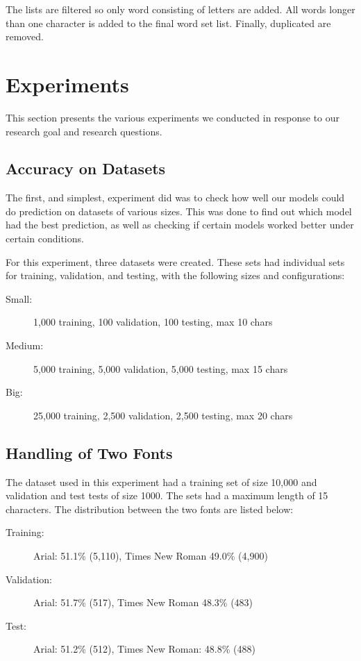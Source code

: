 The lists are filtered so only word consisting of letters are added. All words longer than one character is added to the final word set list. Finally, duplicated are removed.


\section{Experiments}
\label{sec:experiments_details}
This section presents the various experiments we conducted in response to our research goal and research questions.

\subsection{Accuracy on Datasets}
\label{sec:accuracy_on_datasets}
The first, and simplest, experiment did was to check how well our models could do prediction on datasets of various sizes. This was done to find out which model had the best prediction, as well as checking if certain models worked better under certain conditions.

For this experiment, three datasets were created. These sets had individual sets for training, validation, and testing, with the following sizes and configurations:

\vspace{0.5cm}
\begin{minipage}{0.8\linewidth}
    \begin{description}
        \item[Small:]{1,000 training, 100 validation, 100 testing, max 10 chars}
        \item[Medium:]{5,000 training, 5,000 validation, 5,000 testing, max 15 chars}
        \item[Big:]{25,000 training, 2,500 validation, 2,500 testing, max 20 chars}
    \end{description}
\end{minipage}

\subsection{Handling of Two Fonts}
The dataset used in this experiment had a training set of size 10,000 and validation and test tests of size 1000. The sets had a maximum length of 15 characters. The distribution between the two fonts are listed below:

\vspace{0.5cm}
\begin{minipage}{0.8\linewidth}
    \begin{description}
        \item[Training:]{Arial: 51.1\% (5,110), Times New Roman 49.0\% (4,900)}
        \item[Validation:]{Arial: 51.7\% (517), Times New Roman 48.3\% (483)}
        \item[Test:]{Arial: 51.2\% (512), Times New Roman: 48.8\% (488)}
    \end{description}
\end{minipage}

